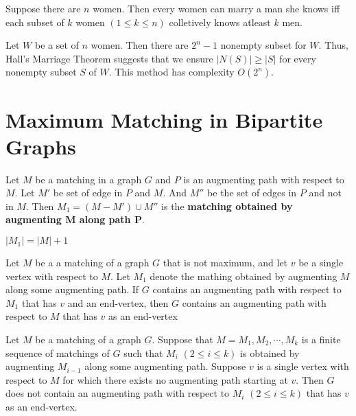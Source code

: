 \begin{remark}
	Suppose there are $n$ women. Then every women can marry a man she knows iff each subset of $k$ women $(1 \le k \le n)$ colletively knows atleast $k$ men. 
\end{remark}

\begin{remark}
	Let $W$ be a set of $n$ women. Then there are $2^n-1$ nonempty subset for $W$. Thus, Hall's Marriage Theorem suggests that we ensure $|N(S)| \ge |S|$ for every nonempty subset $S$ of $W$. This method has complexity $O(2^n)$.
\end{remark}

\section{Maximum Matching in Bipartite Graphs}

\begin{definition}
	Let $M$ be a matching in a graph $G$ and $P$ is an augmenting path with respect to $M$. Let $M'$ be set of edge in $P$ and $M$. And $M''$ be the set of edges in $P$ and not in $M$. Then $M_1 = (M-M') \cup M''$ is the \textbf{matching obtained by augmenting M along path P}.
\end{definition}

\begin{remark}
	$|M_1| = |M|+1$
\end{remark}

\begin{theorem}
	Let $M$ be a a matching of a graph $G$ that is not maximum, and let $v$ be a single vertex with respect to $M$. Let $M_1$ denote the mathing obtained by augmenting $M$ along some augmenting path. If $G$ contains an augmenting path with respect to $M_1$ that has $v$ and an end-vertex, then $G$ contains an augmenting path with respect to $M$ that has $v$ as an end-vertex
\end{theorem}
\begin{corollary}
	Let $M$ be a matching of a graph $G$. Suppose that $M = M_1,M_2,\cdots,M_k$ is a finite sequence of matchings of $G$ such that $M_i$ $(2 \le i \le k)$ is obtained by augmenting $M_{i-1}$ along some augmenting path. Suppose $v$ is a single vertex with respect to $M$ for which there exists no augmenting path starting at $v$. Then $G$ does not contain an augmenting path with respect to $M_i$ $(2 \le i \le k)$ that has $v$ as an end-vertex.
\end{corollary}

